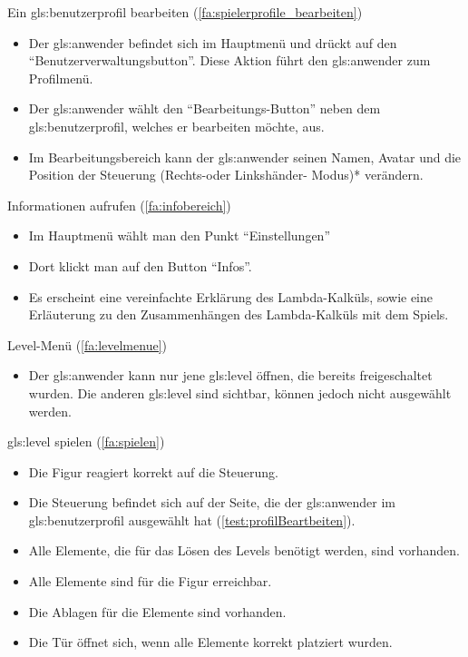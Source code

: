 \documentclass{scrartcl}
\begin{document}
\begin{telist}
	\item Ein \gls{gls:benutzerprofil} bearbeiten (\ref{fa:spielerprofile_bearbeiten}) \label{test:profilBeartbeiten}
	\begin{itemize}
		\item Der \gls{gls:anwender} befindet sich im Hauptmenü und drückt auf den \enquote{Benutzerverwaltungsbutton}. Diese Aktion führt den \gls{gls:anwender} zum Profilmenü.
		\item Der \gls{gls:anwender} wählt den \enquote{Bearbeitungs-Button} neben dem \gls{gls:benutzerprofil}, welches er bearbeiten möchte, aus.
		\item Im Bearbeitungsbereich kann der \gls{gls:anwender} seinen Namen, Avatar und die Position der Steuerung (Rechts-oder Linkshänder- Modus)*  verändern.
	\end{itemize}
	
	\item{Informationen aufrufen} \label{szenarien:infomartionen_aufrufen} (\ref{fa:infobereich})
	\begin{itemize}
		\item Im Hauptmenü wählt man den Punkt \enquote{Einstellungen}
		\item Dort klickt man auf den Button \enquote{Infos}.
		\item Es erscheint eine vereinfachte Erklärung des Lambda-Kalküls, sowie eine Erläuterung zu den Zusammenhängen des Lambda-Kalküls mit dem Spiels.
	\end{itemize}
	
	\item Level-Menü (\ref{fa:levelmenue})
	\begin{itemize}
		\item Der \gls{gls:anwender} kann nur jene \gls{gls:level} öffnen, die bereits freigeschaltet wurden. Die anderen \gls{gls:level} sind sichtbar, können jedoch nicht ausgewählt werden.
	\end{itemize}
	
	\item \gls{gls:level} spielen (\ref{fa:spielen})
	\begin{itemize}
		\item Die Figur reagiert korrekt auf die Steuerung.
		\item Die Steuerung befindet sich auf der Seite, die der \gls{gls:anwender} im \gls{gls:benutzerprofil} ausgewählt hat (\ref{test:profilBeartbeiten}).
		\item Alle Elemente, die für das Lösen des Levels benötigt werden, sind vorhanden.
		\item Alle Elemente sind für die Figur erreichbar.
		\item Die Ablagen für die Elemente sind vorhanden.
		\item Die Tür öffnet sich, wenn alle Elemente korrekt platziert wurden.
	\end{itemize}
	

\end{telist}
\end{document}
